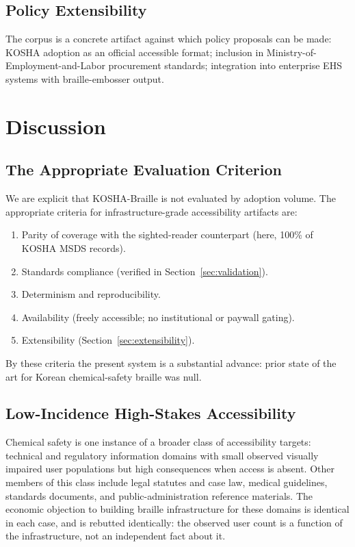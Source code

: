 \documentclass[smallextended]{svjour3}
\begin{document}
\subsection{Policy Extensibility}

The corpus is a concrete artifact against which policy proposals can be made: KOSHA adoption as an official accessible format; inclusion in Ministry-of-Employment-and-Labor procurement standards; integration into enterprise EHS systems with braille-embosser output.

\section{Discussion}
\label{sec:discussion}

\subsection{The Appropriate Evaluation Criterion}

We are explicit that KOSHA-Braille is not evaluated by adoption volume. The appropriate criteria for infrastructure-grade accessibility artifacts are:

\begin{enumerate}
\item Parity of coverage with the sighted-reader counterpart (here, 100\% of KOSHA MSDS records).
\item Standards compliance (verified in Section~\ref{sec:validation}).
\item Determinism and reproducibility.
\item Availability (freely accessible; no institutional or paywall gating).
\item Extensibility (Section~\ref{sec:extensibility}).
\end{enumerate}

By these criteria the present system is a substantial advance: prior state of the art for Korean chemical-safety braille was null.

\subsection{Low-Incidence High-Stakes Accessibility}

Chemical safety is one instance of a broader class of accessibility targets: technical and regulatory information domains with small observed visually impaired user populations but high consequences when access is absent. Other members of this class include legal statutes and case law, medical guidelines, standards documents, and public-administration reference materials. The economic objection to building braille infrastructure for these domains is identical in each case, and is rebutted identically: the observed user count is a function of the infrastructure, not an independent fact about it.
\end{document}
